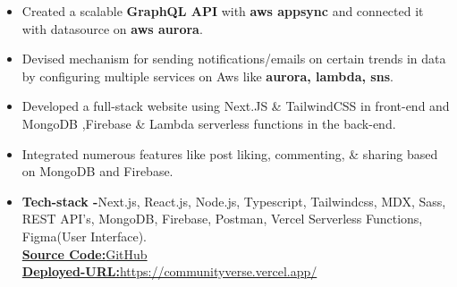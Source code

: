 \documentclass[10pt,a4paper,ragged2e]{altacv}
\begin{document}
\begin{itemize}
\item Created a scalable \textbf{GraphQL API} with \textbf{aws appsync} and connected it with datasource on \textbf{aws aurora}.
\item Devised  mechanism for sending notifications/emails on certain trends in data by configuring multiple services on Aws like \textbf{aurora, lambda, sns}.
\end{itemize}
\begin{itemize}
\item Developed a full-stack website using Next.JS \& TailwindCSS in front-end and MongoDB ,Firebase \& Lambda serverless functions in the back-end.
\item Integrated numerous features like post liking, commenting, \& sharing based on MongoDB and Firebase.
\item \textbf{Tech-stack -}Next.js, React.js, Node.js, Typescript, Tailwindcss, MDX, Sass, REST API's, MongoDB, Firebase, Postman, Vercel Serverless Functions, Figma(User Interface).
\\
 \href{https://github.com/ghulamyazdani/CommunityVerse}{\textbf{Source Code:}GitHub}
 \\
 \href{https://communityverse.vercel.app/}{\textbf{Deployed-URL:}https://communityverse.vercel.app/}

\end{itemize}
\smallskip
\end{document}
